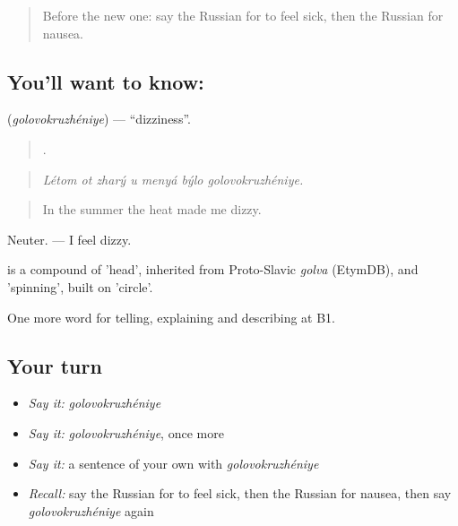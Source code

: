 \label{lesson:RU-C485-golovokruzheniye}



\begin{quote}
Before the new one: say the Russian for to feel sick, then the Russian for nausea.
\end{quote}

\subsection*{You'll want to know: }
\textbf{} (\emph{golovokruzhéniye}) — \textquotedblleft{}dizziness\textquotedblright{}.

\begin{quote}
      .
\end{quote}

\begin{quote}
\emph{Létom ot zharý u menyá býlo golovokruzhéniye.}
\end{quote}

\begin{quote}
In the summer the heat made me dizzy.
\end{quote}

Neuter. \emph{   } — I feel dizzy.

\begin{cousinweb}
\emph{} is a compound of \emph{} 'head', inherited from Proto-Slavic \emph{golva} (EtymDB), and \emph{} 'spinning', built on \emph{} 'circle'.
\end{cousinweb}

\begin{grammarlens}[title={What you've built}]
One more word for telling, explaining and describing at B1.
\end{grammarlens}

\subsection*{Your turn}
\begin{itemize}
\raggedright
  \item \emph{Say it:} \emph{golovokruzhéniye}
  \item \emph{Say it:} \emph{golovokruzhéniye}, once more
  \item \emph{Say it:} a sentence of your own with \emph{golovokruzhéniye}
  \item \emph{Recall:} say the Russian for to feel sick, then the Russian for nausea, then say \emph{golovokruzhéniye} again
\end{itemize}

